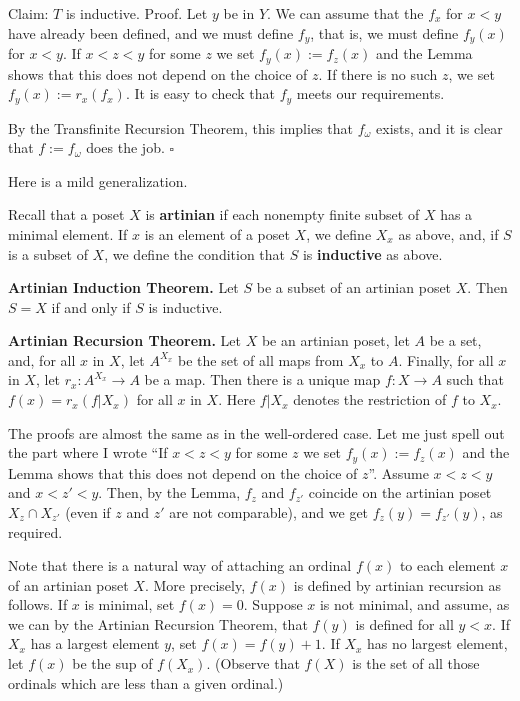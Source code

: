 \documentclass[12pt,letterpaper]{article}
\newcommand{\nn}{\noindent}
\begin{document}
\nn Claim: $T$ is inductive. Proof. Let $y$ be in $Y$. We can assume that the $f_x$ for $x<y$ have already been defined, and we must define $f_y$, that is, we must define $f_y(x)$ for $x<y$. If $x<z<y$ for some $z$ we set $f_y(x):=f_z(x)$ and the Lemma shows that this does not depend on the choice of $z$. If there is no such $z$, we set $f_y(x):=r_x(f_x)$. It is easy to check that $f_y$ meets our requirements. 

By the Transfinite Recursion Theorem, this implies that $f_\omega$ exists, and it is clear that $f:=f_\omega$ does the job. $\square$ 

Here is a mild generalization. %

Recall that a poset $X$ is \textbf{artinian} if each nonempty finite subset of $X$ has a minimal element. If $x$ is an element of a poset $X$, we define $X_x$ as above, and, if $S$ is a subset of $X$, we define the condition that $S$ is \textbf{inductive} as above. 


\nn\textbf{Artinian Induction Theorem.} Let $S$ be a subset of an artinian poset $X$. Then $S=X$ if and only if $S$ is inductive. \pagebreak 

\nn\textbf{Artinian Recursion Theorem.} Let $X$ be an artinian poset, let $A$ be a set, and, for all $x$ in $X$, let $A^{X_x}$ be the set of all maps from $X_x$ to $A$. Finally, for all $x$ in $X$, let $r_x:A^{X_x}\to A$ be a map. Then there is a unique map $f:X\to A$ such that $f(x)=r_x(f|X_x)$ for all $x$ in $X$. Here $f|X_x$ denotes the restriction of $f$ to $X_x$. 

The proofs are almost the same as in the well-ordered case. Let me just spell out the part where I wrote ``If $x<z<y$ for some $z$ we set $f_y(x):=f_z(x)$ and the Lemma shows that this does not depend on the choice of $z$''. Assume $x<z<y$ and $x<z'<y$. Then, by the Lemma, $f_z$ and $f_{z'}$ coincide on the artinian poset $X_z\cap X_{z'}$ (even if $z$ and $z'$ are not comparable), and we get $f_z(y)=f_{z'}(y)$, as required. 

Note that there is a natural way of attaching an ordinal $f(x)$ to each element $x$ of an artinian poset $X$. More precisely, $f(x)$ is defined by artinian recursion as follows. If $x$ is minimal, set $f(x)=0$. Suppose $x$ is not minimal, and assume, as we can by the Artinian Recursion Theorem, that $f(y)$ is defined for all $y<x$. If $X_x$ has a largest element $y$, set $f(x)=f(y)+1$. If $X_x$ has no largest element, let $f(x)$ be the sup of $f(X_x)$. (Observe that $f(X)$ is the set of all those ordinals which are less than a given ordinal.) 
\end{document}
